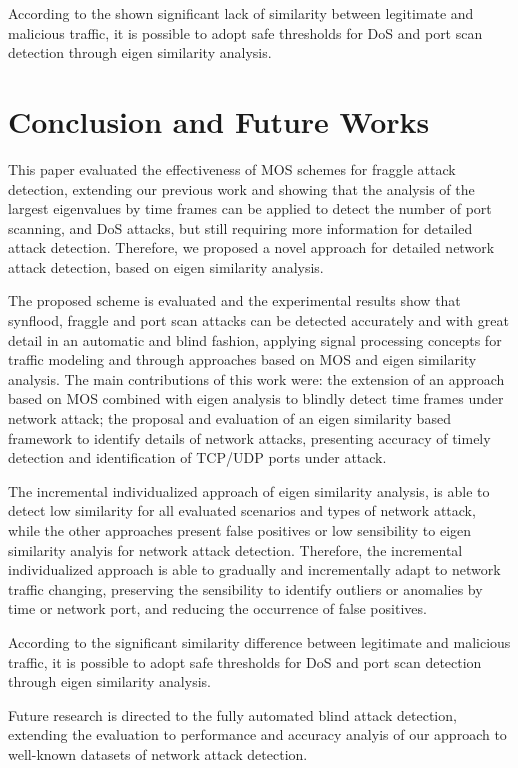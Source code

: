 \documentclass{bmcart}
\begin{document}
According to the shown significant lack of similarity between legitimate and malicious traffic, it is possible to adopt safe thresholds for DoS and port scan detection through eigen similarity analysis.

\section{Conclusion and Future Works}
\label{sec:conclusionandfutureworks}

This paper evaluated the effectiveness of MOS schemes for fraggle attack detection, extending our previous work \cite{tenorio2013greatest} and showing that the analysis of the largest eigenvalues by time frames can be applied to detect the number of port scanning, and DoS attacks, but still requiring more information for detailed attack detection. Therefore, we proposed a novel approach for detailed network attack detection, based on eigen similarity analysis.

The proposed scheme is evaluated and the experimental results show that synflood, fraggle and port scan attacks can be detected accurately and with great detail in an automatic and  blind fashion, applying signal processing concepts for traffic modeling and through approaches based on MOS and eigen similarity analysis. The main contributions of this work were: the extension of an approach based on MOS combined with eigen analysis to blindly detect time frames under network attack; the proposal and evaluation of an eigen similarity based framework to identify details of network attacks, presenting accuracy of timely detection and identification of TCP/UDP ports under attack.

The incremental individualized approach of eigen similarity analysis, is able to detect low similarity for all evaluated scenarios and types of network attack, while the other approaches present false positives or low sensibility to eigen similarity analyis for network attack detection. Therefore, the incremental individualized approach is able to gradually and incrementally adapt to network traffic changing, preserving the sensibility to identify outliers or anomalies by time or network port, and reducing the occurrence of false positives.

According to the significant similarity difference between legitimate and malicious traffic, it is possible to adopt safe thresholds for DoS and port scan detection through eigen similarity analysis.

Future research is directed to the fully automated blind attack detection, extending the evaluation to performance and accuracy analyis of our approach to well-known datasets of network attack detection.
\end{document}
